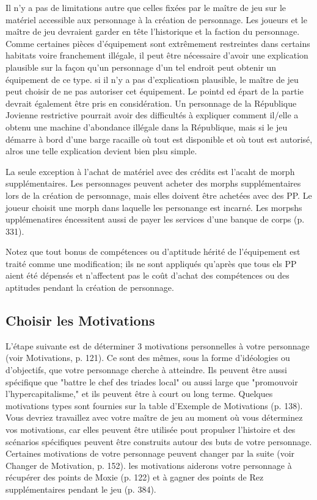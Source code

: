 Il n'y a pas de limitations autre que celles fixées par le maître de jeu sur le matériel accessible aux personnage à la création de personnage. Les joueurs et le maître de jeu devraient garder en tête l'historique et la faction du personnage. Comme certaines pièces d'équipement sont extrêmement restreintes dans certains habitats voire franchement illégale, il peut être nécessaire d'avoir une explication plausible sur la façon qu'un personnage d'un tel endroit peut obtenir un équipement de ce type. si il n'y a pas d'explicatiosn plausible, le maître de jeu peut choisir de ne pas autoriser cet équipement. Le pointd ed épart de la partie devrait également être pris en considération. Un personnage de la République Jovienne restrictive pourrait avoir des difficultés à expliquer comment il/elle a obtenu une machine d'abondance illégale dans la République, mais si le jeu démarre à bord d'une barge racaille où tout est disponible et où tout est autorisé, alros une telle explication devient bien plsu simple. 

La seule exception à l'achat de matériel avec des crédits est l'acaht de morph supplémentaires. Les personnages peuvent acheter des morphs supplémentaires lors de la création de personnage, mais elles doivent être achetées avec des PP. Le joueur choisit une morph dans laquelle les personange est incarné. Les morpshs upplémenatires éncessitent aussi de payer les services d'une banque de corps (p. 331). 

Notez que tout bonus de compétences ou d'aptitude hérité de l'équipement est traité comme une modification; ils ne sont appliqués qu'après que tous els PP aient été dépensés et n'affectent pas le coût d'achat des compétences ou des aptitudes pendant la création de personnage. 

\subsection{Choisir les Motivations} \label{sec:choose-motivations} 

L'étape suivante est de déterminer 3 motivations personnelles à votre personnage (voir Motivations, p. 121). Ce sont des mêmes, sous la forme d'idéologies ou d'objectifs, que votre personnage cherche à atteindre. Ils peuvent être aussi spécifique que "battre le chef des triades local" ou aussi large que "promouvoir l'hypercapitalisme," et ils peuvent être à court ou long terme. Quelques motivations types sont fournies sur la table d'Exemple de Motivations (p. 138). Vous devriez travaillez avec votre maître de jeu au moment où vous déterminez vos motivations, car elles peuvent être utilisée pout propulser l'histoire et des scénarios spécifiques peuvent être construits autour des buts de votre personnage. Certaines motivations de votre personnage peuvent changer par la suite (voir Changer de Motivation, p. 152). les motivations aiderons votre personnage à récupérer des points de Moxie (p. 122) et à gagner des points de Rez supplémentaires pendant le jeu (p. 384). 

